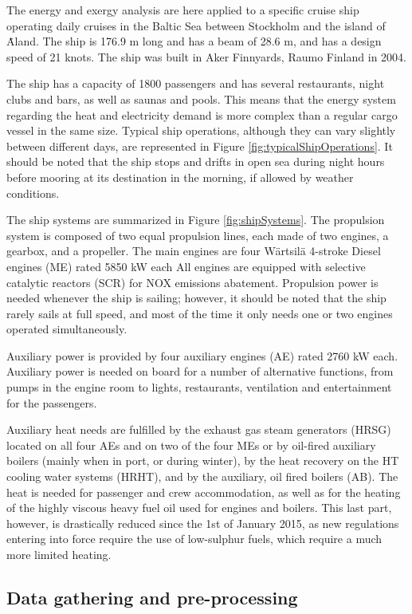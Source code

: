\documentclass[preprint,12pt]{elsarticle}
\begin{document}
The energy and exergy analysis are here applied to a specific  cruise ship operating daily cruises in the Baltic Sea between Stockholm and the island of \.{A}land. The ship is 176.9 m long and has a beam of 28.6 m, and has a design speed of 21 knots. The ship was built in Aker Finnyards, Raumo Finland in 2004.

The ship has a capacity of 1800 passengers and has several restaurants, night clubs and bars, as well as saunas and pools. This means that the energy system regarding the heat and electricity demand is more complex than a regular cargo vessel in the same size. Typical ship operations, although they can vary slightly between different days, are represented in Figure \ref{fig:typicalShipOperations}. It should be noted that the ship stops and drifts in open sea during night hours before mooring at its destination in the morning, if allowed by weather conditions.

The ship systems are summarized in Figure \ref{fig:shipSystems}. The propulsion system is composed of two equal propulsion lines, each made of two engines, a gearbox, and a propeller. The main engines are four Wärtsilä 4-stroke Diesel engines (ME) rated 5850 kW each All engines are equipped with selective catalytic reactors (SCR) for NOX emissions abatement. Propulsion power is needed whenever the ship is sailing; however, it should be noted that the ship rarely sails at full speed, and most of the time it only needs one or two engines operated simultaneously.

Auxiliary power is provided by four auxiliary engines (AE) rated 2760 kW each. Auxiliary power is needed on board for a number of alternative functions, from pumps in the engine room to lights, restaurants, ventilation and entertainment for the passengers. 

Auxiliary heat needs are fulfilled by the exhaust gas steam generators (HRSG) located on all four AEs and on two of the four MEs or by oil-fired auxiliary boilers (mainly when in port, or during winter), by the heat recovery on the HT cooling water systems (HRHT), and by the auxiliary, oil fired boilers (AB). The heat is needed for passenger and crew accommodation, as well as for the heating of the highly viscous heavy fuel oil used for engines and boilers. This last part, however, is drastically reduced since the 1st of January 2015, as new regulations entering into force require the use of low-sulphur fuels, which require a much more limited heating.

\subsection{Data gathering and pre-processing} \label{sec:met:gathering}
\end{document}
